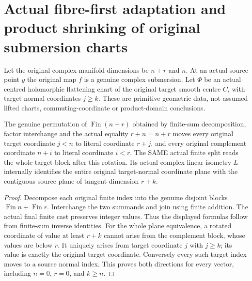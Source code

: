 \section{Actual fibre-first adaptation and product shrinking of original submersion charts}
Let the original complex manifold dimensions be $n+r$ and $n$. At an actual source point $y$ the original map $f$ is a genuine complex submersion. Let $\Phi$ be an actual centred holomorphic flattening chart of the original target smooth centre $C$, with target normal coordinates $j\geq k$. These are primitive geometric data, not assumed lifted charts, commuting-coordinate or product-domain conclusions.

\begin{lemma}
\label{hir:submersion-adapted-fibre-first-rotation}
\leanok
{}

The genuine permutation of $\operatorname{Fin}(n+r)$ obtained by finite-sum decomposition, factor interchange and the actual equality $r+n=n+r$ moves every original target coordinate $j<n$ to literal coordinate $r+j$, and every original complement coordinate $n+i$ to literal coordinate $i<r$. The SAME actual finite split reads the whole target block after this rotation. Its actual complex linear isometry $L$ internally identifies the entire original target-normal coordinate plane with the contiguous source plane of tangent dimension $r+k$.
\end{lemma}
\begin{proof}
Decompose each original finite index into the genuine disjoint blocks $\operatorname{Fin}n+\operatorname{Fin}r$. Interchange the two summands and join using finite addition. The actual final finite cast preserves integer values. Thus the displayed formulas follow from finite-sum inverse identities. For the whole plane equivalence, a rotated coordinate of value at least $r+k$ cannot arise from the complement block, whose values are below $r$. It uniquely arises from target coordinate $j$ with $j\geq k$; its value is exactly the original target coordinate. Conversely every such target index moves to a source normal index. This proves both directions for every vector, including $n=0$, $r=0$, and $k\geq n$.
\end{proof}

